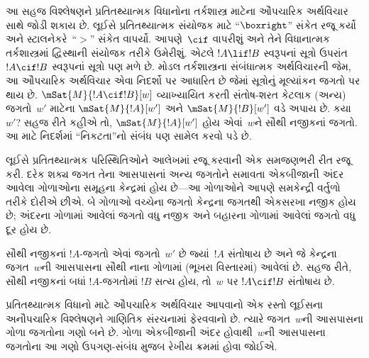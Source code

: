 આ સહજ વિશ્લેષણને પ્રતિતથ્યાત્મક વિધાનોના તર્કશાસ્ત્ર માટેના ઔપચારિક
અર્થવિચાર સાથે જોડી શકાય છે. લૂઈસે પ્રતિતથ્યાત્મક સંયોજક માટે
``$\boxright$'' સંકેત રજૂ કર્યો અને સ્ટાલનેકરે~``$>$'' સંકેત વાપર્યો.
આપણે~$\cif$ વાપરીશું અને તેને વિધાનાત્મક તર્કશાસ્ત્રમાં દ્વિસ્થાની
સંયોજક તરીકે ઉમેરીશું. એટલે $!A \lif
!B$ સ્વરૂપનાં સૂત્રો ઉપરાંત~$!A \cif !B$ સ્વરૂપનાં
સૂત્રો પણ મળે છે. મોડલ તર્કશાસ્ત્રના સંબંધાત્મક અર્થવિચારની
જેમ, આ ઔપચારિક અર્થવિચાર એવા નિદર્શો પર આધારિત છે જેમાં
સૂત્રોનું મૂલ્યાંકન જગતો પર થાય છે. $\mSat{M}{!A \cif !B}[w]$
વ્યાખ્યાયિત કરતી સંતોષ-શરત કેટલાક (અન્ય) જગતો~$w'$ માટેના
$\mSat{M}{!A}[w']$ અને $\mSat{M}{!B}[w']$ વડે અપાય છે. કયા~$w'$?
સહજ રીતે કહીએ તો, $\mSat{M}{!A}[w']$ હોય એવાં~$w$ને સૌથી નજીકનાં
જગતો. આ માટે નિદર્શમાં ``નિકટતા''નો સંબંધ પણ સામેલ કરવો પડે છે.

લૂઈસે પ્રતિતથ્યાત્મક પરિસ્થિતિઓને આલેખમાં રજૂ કરવાની એક સમજણભરી
રીત રજૂ કરી. દરેક શક્ય જગત તેના આસપાસનાં અન્ય જગતોને સમાવતા
એકબીજાની અંદર આવેલા ગોળાઓના સમૂહના કેન્દ્રમાં હોય છે---આ ગોળાઓને
આપણે સમકેન્દ્રી વર્તુળો તરીકે દોરીએ છીએ. બે ગોળાઓ વચ્ચેના જગતો
કેન્દ્રના જગતથી એકસરખા નજીક હોય છે; અંદરના ગોળામાં આવેલાં જગતો
વધુ નજીક અને બહારના ગોળામાં આવેલાં જગતો વધુ દૂર હોય છે.
\begin{center}
\end{center}
સૌથી નજીકનાં $!A$-જગતો એવાં જગતો~$w'$ છે જ્યાં~$!A$ સંતોષાય છે
અને જે કેન્દ્રના જગત~$w$ની આસપાસના સૌથી નાના ગોળામાં (ભૂખરા
વિસ્તારમાં) આવેલાં છે. સહજ રીતે, સૌથી નજીકનાં બધાં $!A$-જગતોમાં
$!B$ સત્ય હોય, તો~$w$ પર $!A \cif !B$ સંતોષાય છે.
\endgroup


\begingroup
\makeatletter{}\makeatother


\label{guunit:OLP-0524}


પ્રતિતથ્યાત્મક વિધાનો માટે ઔપચારિક અર્થવિચાર આપવાનો એક રસ્તો લૂઈસના
અનૌપચારિક વિશ્લેષણને ગાણિતિક સંરચનામાં ફેરવવાનો છે. ત્યારે
જગત~$w$ની આસપાસના ગોળા જગતોના ગણો બને છે. ગોળા એકબીજાની અંદર
હોવાથી~$w$ની આસપાસના જગતોના આ ગણો ઉપગણ-સંબંધ મુજબ રેખીય ક્રમમાં
હોવા જોઈએ.

